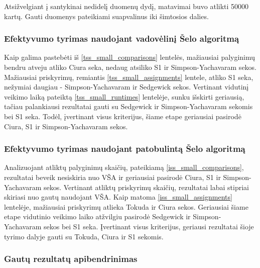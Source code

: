 \documentclass{VUMIFInfKursinis}
\begin{document}
Atsižvelgiant į santykinai nedidelį duomenų dydį, matavimai buvo atlikti 50000 kartų.
Gauti duomenys pateikiami suapvalinus iki šimtosios dalies.

\subsubsection{Efektyvumo tyrimas naudojant vadovėlinį Šelo algoritmą}

Kaip galima pastebėti iš \ref{tss_small_comparisons} lentelės, mažiausiai palyginimų bendru atveju atliko Ciura seka,
nedaug atsiliko S1 ir Simpson-Yachavaram sekos. Mažiausiai priskyrimų, remiantis \ref{tss_small_assignments} lentele, atliko S1 seka, nežymiai daugiau - Simpson-Yachavaram ir Sedgewick sekos.
Vertinant vidutinį veikimo laiką pateiktą \ref{tss_small_runtimes} lentelėje, sunku išskirti geriausią,
tačiau palankiausi rezultatai gauti su Sedgewick ir Simpson-Yachavaram sekomis bei S1 seka.
Todėl, įvertinant visus kriterijus, šiame etape geriausiai pasirodė Ciura, S1 ir Simpson-Yachavaram sekos.

\subsubsection{Efektyvumo tyrimas naudojant patobulintą Šelo algoritmą}

Analizuojant atliktų palyginimų skaičių, pateikiamą \ref{iss_small_comparisons}, rezultatai beveik nesiskiria nuo VŠA
ir geriausiai pasirodė Ciura, S1 ir Simpson-Yachavaram sekos.
Vertinant atliktų priskyrimų skaičių, rezultatai labai stipriai skiriasi nuo gautų naudojant VŠA.
Kaip matoma \ref{iss_small_assignments} lentelėje, mažiausiai priskyrimų atlieka Tokuda ir Ciura sekos.
Geriausiai šiame etape vidutinio veikimo laiko atžvilgiu pasirodė Sedgewick ir Simpson-Yachavaram sekos bei S1 seka.
Įvertinant visus kriterijus, geriausi rezultatai šioje tyrimo dalyje gauti su Tokuda, Ciura ir S1 sekomis.

\subsubsection{Gautų rezultatų apibendrinimas}
\end{document}
